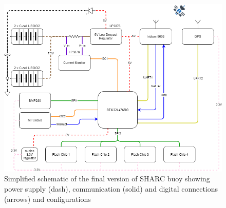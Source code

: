 \begin{landscape}\centering
	\vspace*{\fill}
	\begin{figure}[htpb]
		\centering
		\includegraphics[height=0.6\textheight, width=1.2\textwidth]{figs/SHARC_Final.png}
		\caption{Simplified schematic of the final version of SHARC buoy showing power supply (dash), communication (solid) and digital connections (arrows) and configurations}
		\label{fig:sharc_final}
	\end{figure}
	\vfill
\end{landscape}


